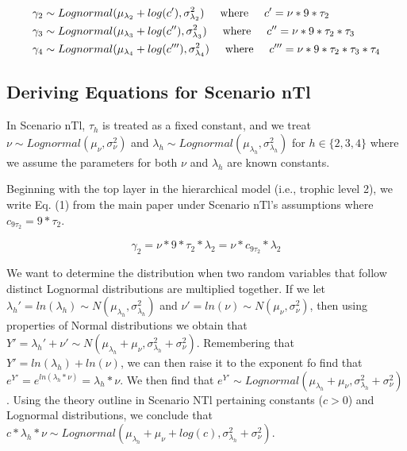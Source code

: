 \documentclass[oneside,12pt,final]{sty/ucthesis-CA2012}
\begin{document}
\begin{mainmatter}
\begin{equation}
\begin{split}
\gamma_2 & \sim Lognormal(\mu_{\lambda_2} + log(c'), \sigma^2_{\lambda_2}) \hspace{5mm} \text{where} \hspace{5mm} c' = \nu*9*\tau_2\\
\gamma_3 & \sim Lognormal(\mu_{\lambda_3} + log(c''), \sigma^2_{\lambda_3}) \hspace{5mm} \text{where} \hspace{5mm} c'' = \nu*9*\tau_2*\tau_3 \\
\gamma_4 & \sim Lognormal(\mu_{\lambda_4} + log(c'''), \sigma^2_{\lambda_4}) \hspace{5mm} \text{where} \hspace{5mm} c''' = \nu*9*\tau_2*\tau_3*\tau_4 \\
\end{split}
\end{equation}

\subsection{Deriving Equations for Scenario nTl}
In Scenario nTl, $\tau_h$ is treated as a fixed constant, and we treat $\nu \sim Lognormal(\mu_\nu, \sigma^2_\nu)$ and $\lambda_h \sim Lognormal(\mu_{\lambda_h}, \sigma^2_{\lambda_h} )$ for $h \in \{2, 3, 4\}$ where we assume the parameters for both $\nu$ and $\lambda_h$ are known constants. 

\vspace{5mm}

Beginning with the top layer in the hierarchical model (i.e., trophic level 2), we write Eq. (1) from the main paper under Scenario nTl's assumptions where $c_{9\tau_2}=9*\tau_2$.

\begin{equation*}
\gamma_2 = \nu * 9 * \tau_2 *\lambda_2  = \nu * c_{9\tau_2} *\lambda_2 
\end{equation*}

We want to determine the distribution when two random variables that follow distinct Lognormal distributions are multiplied together. If we let $\lambda_h' = ln(\lambda_h) \sim N(\mu_{\lambda_h}, \sigma^2_{\lambda_h})$ and $\nu' = ln(\nu) \sim N(\mu_\nu, \sigma^2_\nu)$, then using properties of Normal distributions we obtain that $Y' = \lambda_h' + \nu' \sim N(\mu_{\lambda_h} + \mu_\nu, \sigma^2_{\lambda_h} + \sigma^2_\nu)$. Remembering that $Y' = ln(\lambda_h) + ln(\nu)$, we can then raise it to the exponent fo find that $e^{Y'} = e^{ln(\lambda_h*\nu)} = \lambda_h*\nu$. We then find that $e^{Y'} \sim Lognormal(\mu_{\lambda_h} + \mu_\nu, \sigma^2_{\lambda_h} + \sigma^2_\nu)$. Using the theory outline in Scenario NTl pertaining constants ($c>0$) and Lognormal distributions, we conclude that $c*\lambda_h*\nu \sim Lognormal(\mu_{\lambda_h} + \mu_\nu + log(c),  \sigma^2_{\lambda_h} + \sigma^2_\nu)$.


\end{mainmatter}
\end{document}
